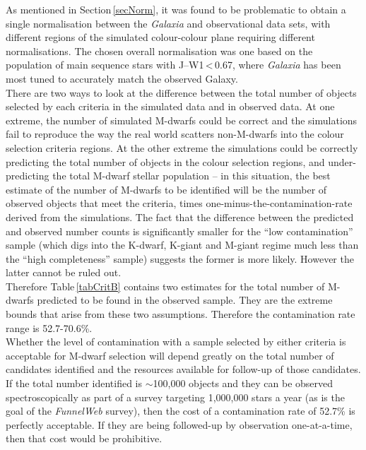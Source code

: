 As mentioned in Section\,\ref{secNorm}, it was found to be problematic to obtain a single normalisation between the {\em Galaxia} and observational data sets, with different regions of the simulated colour-colour plane requiring different normalisations. The chosen overall normalisation was one based on the population of main sequence stars with J--W1\,\textless\,0.67, where {\em Galaxia} has been most tuned to accurately match the observed Galaxy.\\

There are two ways to look at the difference between the total number of objects selected by each criteria in the simulated data and in observed data. At one extreme, the number of simulated M-dwarfs could be correct and the simulations fail to reproduce the way the real world scatters non-M-dwarfs into the colour selection criteria regions. At the other extreme the simulations could be correctly predicting the total number of objects in the colour selection regions, and under-predicting the total M-dwarf stellar population -- in this situation, the best estimate of the number of M-dwarfs to be identified will be the number of observed objects that meet the criteria, times one-minus-the-contamination-rate derived from the simulations. The fact that the difference between the predicted and observed number counts is significantly smaller for the ``low contamination'' sample (which digs into the K-dwarf, K-giant and M-giant regime much less than the ``high completeness'' sample) suggests the former is more likely. However the latter cannot be ruled out.\\

Therefore Table\,\ref{tabCritB} contains two estimates for the total number of M-dwarfs predicted to be found in the observed sample. They are the extreme bounds that arise from these two assumptions. Therefore the contamination rate range is 52.7-70.6\%.\\

Whether the level of contamination with a sample selected by either criteria is acceptable for M-dwarf selection will depend greatly on the total number of candidates identified and the resources available for follow-up of those candidates. If the total number identified is $\sim$100,000 objects and they can be observed spectroscopically as part of a survey targeting 1,000,000 stars a year (as is the goal of the {\em FunnelWeb} survey), then the cost of a contamination rate of 52.7\% is perfectly acceptable. If they are being followed-up by observation one-at-a-time, then that cost would be prohibitive.\\

